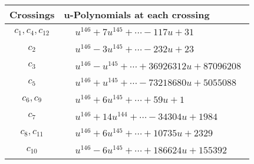 \documentclass[1p]{elsarticle_modified}
\theoremstyle{definition}
\begin{document}
\begin{tabular}{m{50pt}|m{274pt}}
Crossings & \hspace{64pt}u-Polynomials at each crossing \\
\hline $$\begin{aligned}c_{1},c_{4},c_{12}\end{aligned}$$&$\begin{aligned}
&u^{146}+7 u^{145}+\cdots-117 u+31
\end{aligned}$\\
\hline $$\begin{aligned}c_{2}\end{aligned}$$&$\begin{aligned}
&u^{146}-3 u^{145}+\cdots-232 u+23
\end{aligned}$\\
\hline $$\begin{aligned}c_{3}\end{aligned}$$&$\begin{aligned}
&u^{146}- u^{145}+\cdots+36926312 u+87096208
\end{aligned}$\\
\hline $$\begin{aligned}c_{5}\end{aligned}$$&$\begin{aligned}
&u^{146}+u^{145}+\cdots-73218680 u+5055088
\end{aligned}$\\
\hline $$\begin{aligned}c_{6},c_{9}\end{aligned}$$&$\begin{aligned}
&u^{146}+6 u^{145}+\cdots+59 u+1
\end{aligned}$\\
\hline $$\begin{aligned}c_{7}\end{aligned}$$&$\begin{aligned}
&u^{146}+14 u^{144}+\cdots-34304 u+1984
\end{aligned}$\\
\hline $$\begin{aligned}c_{8},c_{11}\end{aligned}$$&$\begin{aligned}
&u^{146}+6 u^{145}+\cdots+10735 u+2329
\end{aligned}$\\
\hline $$\begin{aligned}c_{10}\end{aligned}$$&$\begin{aligned}
&u^{146}-6 u^{145}+\cdots+186624 u+155392
\end{aligned}$\\
\hline
\end{tabular}\\~\\
\end{document}
